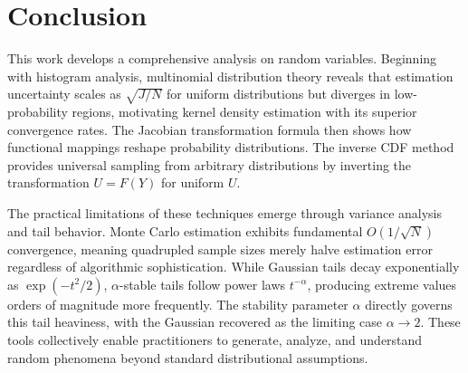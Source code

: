 \documentclass[
	a4paper, %
	10pt, %
	twoside, %
]{LTJournalArticle}
\begin{document}

\section{Conclusion}

This work develops a comprehensive analysis on random variables. Beginning with histogram analysis, multinomial distribution theory reveals that estimation uncertainty scales as $\sqrt{J/N}$ for uniform distributions but diverges in low-probability regions, motivating kernel density estimation with its superior convergence rates. The Jacobian transformation formula then shows how functional mappings reshape probability distributions. The inverse CDF method provides universal sampling from arbitrary distributions by inverting the transformation $U = F(Y)$ for uniform $U$.

The practical limitations of these techniques emerge through variance analysis and tail behavior. Monte Carlo estimation exhibits fundamental $O(1/\sqrt{N})$ convergence, meaning quadrupled sample sizes merely halve estimation error regardless of algorithmic sophistication. While Gaussian tails decay exponentially as $\exp(-t^2/2)$, $\alpha$-stable tails follow power laws $t^{-\alpha}$, producing extreme values orders of magnitude more frequently. The stability parameter $\alpha$ directly governs this tail heaviness, with the Gaussian recovered as the limiting case $\alpha \to 2$. These tools collectively enable practitioners to generate, analyze, and understand random phenomena beyond standard distributional assumptions.


\printbibliography %

\end{document}
